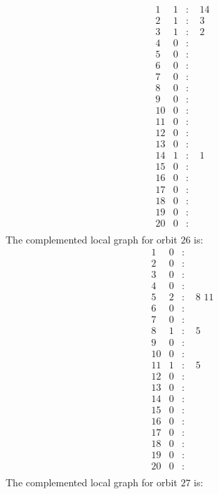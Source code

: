 \documentclass[12pt]{article}
\begin{document}
\begin{equation*}
\begin{array}{rrcl}
1&1&:&\,\,14\\
2&1&:&\,\,3\\
3&1&:&\,\,2\\
4&0&:&\\
5&0&:&\\
6&0&:&\\
7&0&:&\\
8&0&:&\\
9&0&:&\\
10&0&:&\\
11&0&:&\\
12&0&:&\\
13&0&:&\\
14&1&:&\,\,1\\
15&0&:&\\
16&0&:&\\
17&0&:&\\
18&0&:&\\
19&0&:&\\
20&0&:&\\
\end{array}
\end{equation*}
The complemented local graph for orbit $26$ is:
\begin{equation*}
\begin{array}{rrcl}
1&0&:&\\
2&0&:&\\
3&0&:&\\
4&0&:&\\
5&2&:&\,\,8\,\,11\\
6&0&:&\\
7&0&:&\\
8&1&:&\,\,5\\
9&0&:&\\
10&0&:&\\
11&1&:&\,\,5\\
12&0&:&\\
13&0&:&\\
14&0&:&\\
15&0&:&\\
16&0&:&\\
17&0&:&\\
18&0&:&\\
19&0&:&\\
20&0&:&\\
\end{array}
\end{equation*}
The complemented local graph for orbit $27$ is:
\end{document}
